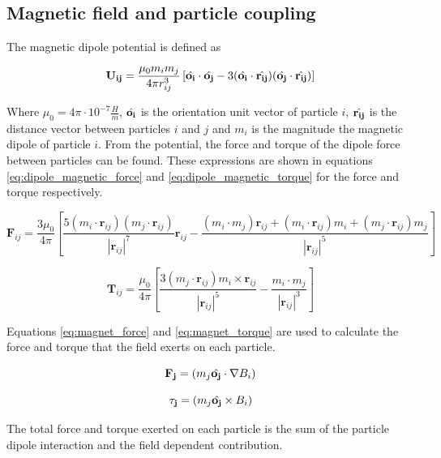 \subsection{Magnetic field and particle coupling}
\label{section:lbm_colloids_magnetics}

The magnetic dipole potential is defined as

\begin{equation}
    \mathbf{U_{ij}} = \frac{\mu_0 m_i m_j}{4\pi r_{ij}^{3}} \left[ \Hat{\mathbf{o_i}} \cdot \Hat{\mathbf{o_j}} - 
    3(\Hat{\mathbf{o_i}} \cdot \Hat{\mathbf{r_{ij}}})(\Hat{\mathbf{o_j}} \cdot \Hat{\mathbf{r_{ij}}}) \right]
    \label{eq:magnet_potential}
\end{equation}

Where $\mu_0 = 4\pi \cdot 10^{-7} \frac{H}{m}$,  $\Hat{\mathbf{o_i}}$ is the orientation unit vector of particle 
$i$, $\Hat{\mathbf{r_{ij}}}$ is the distance vector between particles $i$ and $j$ and $m_i$ is the magnitude the 
magnetic dipole of particle $i$. From the potential, the force and torque of the dipole force between particles 
can be found. These expressions are shown in equations \ref{eq:dipole_magnetic_force} and \ref{eq:dipole_magnetic_torque} 
for the force and torque respectively.

\begin{equation}
    \mathbf{F}_{ij} = \frac{3 \mu_0}{4 \pi} [\frac{5(m_i \cdot \mathbf{r}_{ij})(m_j 
    \cdot \mathbf{r}_{ij})}{|\mathbf{r}_{ij}|^7}\mathbf{r}_{ij} - \frac{(m_i \cdot m_{j})\mathbf{r}_{ij} + 
    (m_i \cdot \mathbf{r}_{ij})m_i + (m_j \cdot \mathbf{r}_{ij})m_j }{|\mathbf{r}_{ij}|^5}]
\label{eq:dipole_magnetic_force}
\end{equation}

\begin{equation}
    \mathbf{T}_{ij} = \frac{\mu_0}{4 \pi}[ \frac{3(m_j \cdot \mathbf{r}_{ij})m_i \times \mathbf{r}_{ij} }
    {|\mathbf{r}_{ij}|^5} - \frac{m_i \cdot m_j }{|\mathbf{r}_{ij}|^3} ]
    \label{eq:dipole_magnetic_torque}
\end{equation}

Equations \ref{eq:magnet_force} and \ref{eq:magnet_torque} are used to calculate the force and torque that the 
field exerts on each particle.

\begin{equation}
    \mathbf{F_{j}} = (m_j \Hat{\mathbf{o_j}} \cdot \nabla B_i)
    \label{eq:magnet_force}
\end{equation}

\begin{equation}
    \mathbf{\tau_j} = (m_j \Hat{\mathbf{o_j}} \times B_i)
    \label{eq:magnet_torque}
\end{equation}

The total force and torque exerted on each particle is the sum of the particle dipole interaction and the field 
dependent contribution. 